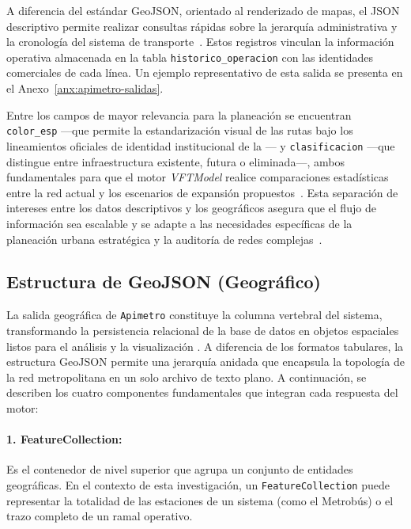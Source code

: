A diferencia del estándar GeoJSON, orientado al renderizado de mapas, el JSON descriptivo permite realizar consultas rápidas sobre la jerarquía administrativa y la cronología del sistema de transporte~\parencite{cabrera2025apimetro}. Estos registros vinculan la información operativa almacenada en la tabla \texttt{historico\_operacion} con las identidades comerciales de cada línea. Un ejemplo representativo de esta salida se presenta en el Anexo~\ref{anx:apimetro-salidas}.

Entre los campos de mayor relevancia para la planeación se encuentran \texttt{color\_esp} —que permite la estandarización visual de las rutas bajo los lineamientos oficiales de identidad institucional de la \zmvm{}— y \texttt{clasificacion} —que distingue entre infraestructura existente, futura o eliminada—, ambos fundamentales para que el motor \textit{VFTModel} realice comparaciones estadísticas entre la red actual y los escenarios de expansión propuestos~\parencite{cabrera2026VFTModel, adip_gtfs_2024}. Esta separación de intereses entre los datos descriptivos y los geográficos asegura que el flujo de información sea escalable y se adapte a las necesidades específicas de la planeación urbana estratégica y la auditoría de redes complejas~\parencite{fortin2016innovative}.

\subsection{Estructura de GeoJSON (Geográfico)}
\label{subsec:estructura-geojson-geografico}

La salida geográfica de \texttt{Apimetro} constituye la columna vertebral del sistema, transformando la persistencia relacional de la base de datos en objetos espaciales listos para el análisis y la visualización \parencite{cabrera2025apimetro}. 
A diferencia de los formatos tabulares, la estructura GeoJSON permite una jerarquía anidada que encapsula la topología de la red metropolitana en un solo archivo de texto plano. A continuación, se describen los cuatro componentes fundamentales 
que integran cada respuesta del motor:

\paragraph{1. FeatureCollection:} Es el contenedor de nivel superior que agrupa un conjunto de entidades geográficas. En el contexto de esta investigación, un \texttt{FeatureCollection} puede representar la totalidad de las estaciones de un sistema 
(como el Metrobús) o el trazo completo de un ramal operativo.

